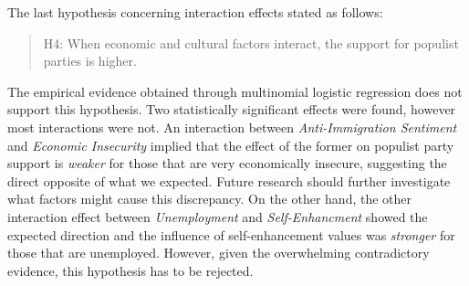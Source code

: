 \documentclass[]{article}
\begin{document}
The last hypothesis concerning interaction effects stated as follows:

\begin{quote}
H4: When economic and cultural factors interact, the support for
populist parties is higher.
\end{quote}

The empirical evidence obtained through multinomial logistic regression
does not support this hypothesis. Two statistically significant effects
were found, however most interactions were not. An interaction between
\emph{Anti-Immigration Sentiment} and \emph{Economic Insecurity} implied
that the effect of the former on populist party support is \emph{weaker}
for those that are very economically insecure, suggesting the direct
opposite of what we expected. Future research should further investigate
what factors might cause this discrepancy. On the other hand, the other
interaction effect between \emph{Unemployment} and
\emph{Self-Enhancment} showed the expected direction and the influence
of self-enhancement values was \emph{stronger} for those that are
unemployed. However, given the overwhelming contradictory evidence, this
hypothesis has to be rejected.
\end{document}
